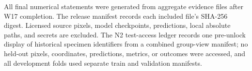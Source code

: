 All final numerical statements were generated from aggregate evidence files after W17 completion. The release manifest records each included file's SHA-256 digest. Licensed source pixels, model checkpoints, predictions, local absolute paths, and secrets are excluded. The N2 test-access ledger records one pre-unlock display of historical specimen identifiers from a combined group-view manifest; no held-out pixels, coordinates, predictions, metrics, or outcomes were accessed, and all development folds used separate train and validation manifests.
